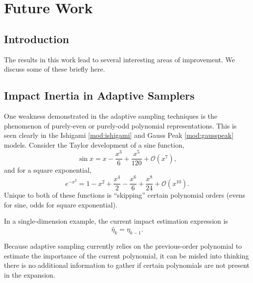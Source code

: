 
\chapter{Future Work} %

\label{Chapter9} %



\section{Introduction}
The results in this work lead to several interesting areas of improvement.  We discuss some of these briefly
here.

\section{Impact Inertia in Adaptive Samplers}
One weakness demonstrated in the adaptive sampling techniques is the phenomenon of purely-even or purely-odd
polynomial representations.  This is seen clearly in the Ishigami \ref{mod:ishigami} and Gauss Peak
\ref{mod:gausspeak} models.  Consider the Taylor development of a sine function,
\begin{equation}\label{eq:sine}
  \sin x = x - \frac{x^3}{6} + \frac{x^5}{120} + \mathcal{O}(x^7),
\end{equation}
and for a square exponential,
\begin{equation}\label{eq:sine}
  e^{-x^2} = 1 - x^2 + \frac{x^4}{2} - \frac{x^6}{6} + \frac{x^8}{24} + \mathcal{O}(x^10).
\end{equation}
Unique to both of these functions is ``skipping'' certain polynomial orders (evens for sine, odds for square
exponential).

In a single-dimension example, the current impact estimation expression is
\begin{equation}
  \tilde{\eta_k}= \eta_{k-1}.
\end{equation}

Because adaptive sampling currently relies on the previous-order polynomial to estimate the
importance of the current polynomial, it can be misled into thinking there is no additional information to
gather if certain polynomials are not present in the expansion.

